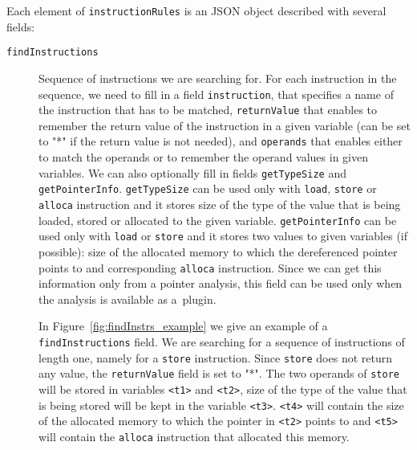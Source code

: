 Each element of \texttt{instructionRules} is an JSON object described with
several fields:
\begin{description}
    \item[\texttt{findInstructions}] Sequence of instructions we are searching
    for. For each instruction in the sequence, we need to fill in a field
        \texttt{instruction}, that specifies a name of the instruction that has
        to be matched, \texttt{returnValue} that enables to remember the return
        value of the instruction in a given variable (can be set to "*" if the
        return value is not needed), and \texttt{operands} that enables either
        to match the operands or to remember the operand values in given
        variables. We can also optionally fill in fields \texttt{getTypeSize}
        and \texttt{getPointerInfo}. \texttt{getTypeSize} can be used only with
        \texttt{load}, \texttt{store} or \texttt{alloca} instruction and it
        stores size of the type of the value that is being loaded, stored or
        allocated to the given variable. \texttt{getPointerInfo} can be used
        only with \texttt{load} or \texttt{store} and it stores two values to
        given variables (if possible): size of the allocated memory to which
        the dereferenced pointer points to and corresponding \texttt{alloca}
        instruction. Since we can get this information only from a pointer
        analysis, this field can be used only when the analysis is available as
        a~plugin.

        In Figure~\ref{fig:findInstrs_example} we give an example of
        a \texttt{findInstructions} field. We are searching for a sequence of
        instructions of length one, namely for a \texttt{store} instruction.
        Since \texttt{store} does not return any value, the
        \texttt{returnValue} field is set to "*". The two operands of
        \texttt{store} will be stored in variables \texttt{<t1>} and
        \texttt{<t2>}, size of the type of the value that is being stored will
        be kept in the variable \texttt{<t3>}. \texttt{<t4>} will contain the
        size of the allocated memory to which the pointer in \texttt{<t2>}
        points to and \texttt{<t5>} will contain the \texttt{alloca}
        instruction that allocated this memory.

        \begin{minipage}{\linewidth}
        
        \label{fig:findInstrs_example}
      \end{minipage}


\end{description}
